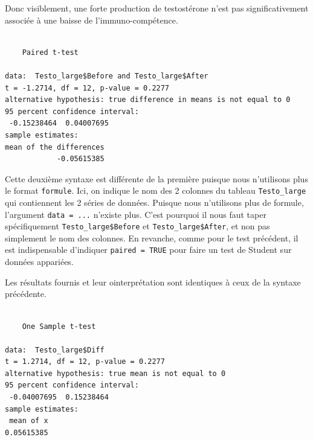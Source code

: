 \documentclass[a4paperpaper,]{article}
\newenvironment{Shaded}{\begin{snugshade}}{\end{snugshade}}
\newcommand{\CommentTok}[1]{\textcolor[rgb]{0.54,0.53,0.53}{#1}}
\newcommand{\DataTypeTok}[1]{\textcolor[rgb]{0.00,0.34,0.68}{#1}}
\newcommand{\DecValTok}[1]{\textcolor[rgb]{0.69,0.50,0.00}{#1}}
\newcommand{\KeywordTok}[1]{\textcolor[rgb]{0.12,0.11,0.11}{\textbf{#1}}}
\newcommand{\NormalTok}[1]{\textcolor[rgb]{0.12,0.11,0.11}{#1}}
\newcommand{\OperatorTok}[1]{\textcolor[rgb]{0.12,0.11,0.11}{#1}}
\newcommand{\OtherTok}[1]{\textcolor[rgb]{0.00,0.43,0.16}{#1}}
\begin{document}
Donc visiblement, une forte production de testostérone n'est pas significativement associée à une baisse de l'immuno-compétence.

\begin{Shaded}
\end{Shaded}

\begin{verbatim}

    Paired t-test

data:  Testo_large$Before and Testo_large$After
t = -1.2714, df = 12, p-value = 0.2277
alternative hypothesis: true difference in means is not equal to 0
95 percent confidence interval:
 -0.15238464  0.04007695
sample estimates:
mean of the differences 
            -0.05615385 
\end{verbatim}

Cette deuxième syntaxe est différente de la première puisque nous n'utilisons plus le format \texttt{formule}. Ici, on indique le nom des 2 colonnes du tableau \texttt{Testo\_large} qui contiennent les 2 séries de données. Puisque nous n'utilisons plus de formule, l'argument \texttt{data\ =\ ...} n'existe plus. C'est pourquoi il nous faut taper spécifiquement \texttt{Testo\_large\$Before} et \texttt{Testo\_large\$After}, et non pas simplement le nom des colonnes. En revanche, comme pour le test précédent, il est indispensable d'indiquer \texttt{paired\ =\ TRUE} pour faire un test de Student sur données appariées.

Les résultats fournis et leur ointerprétation sont identiques à ceux de la syntaxe précédente.

\begin{Shaded}
\end{Shaded}

\begin{verbatim}

    One Sample t-test

data:  Testo_large$Diff
t = 1.2714, df = 12, p-value = 0.2277
alternative hypothesis: true mean is not equal to 0
95 percent confidence interval:
 -0.04007695  0.15238464
sample estimates:
 mean of x 
0.05615385 
\end{verbatim}
\end{document}
